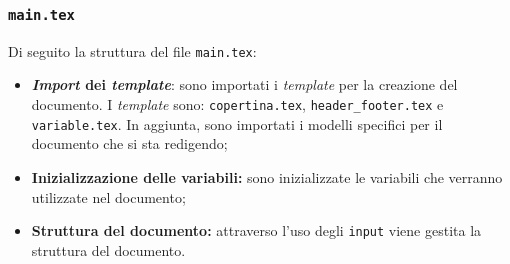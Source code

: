 \subsubsection{\texttt{main.tex}}
Di seguito la struttura del file \texttt{main.tex}:
\begin{itemize}
	\item \textbf{\textit{Import} dei \textit{template}}: sono importati i \textit{template} per la
	      creazione del documento. I \textit{template} sono: \texttt{copertina.tex},
	      \texttt{header\_footer.tex} e \texttt{variable.tex}. In aggiunta, sono
	      importati i modelli specifici per il documento che si sta redigendo;

	\item \textbf{Inizializzazione delle variabili:} sono inizializzate le
	      variabili che verranno utilizzate nel documento;

	\item \textbf{Struttura del documento:} attraverso l'uso degli
	      \texttt{input} viene gestita la struttura del documento.
\end{itemize}

